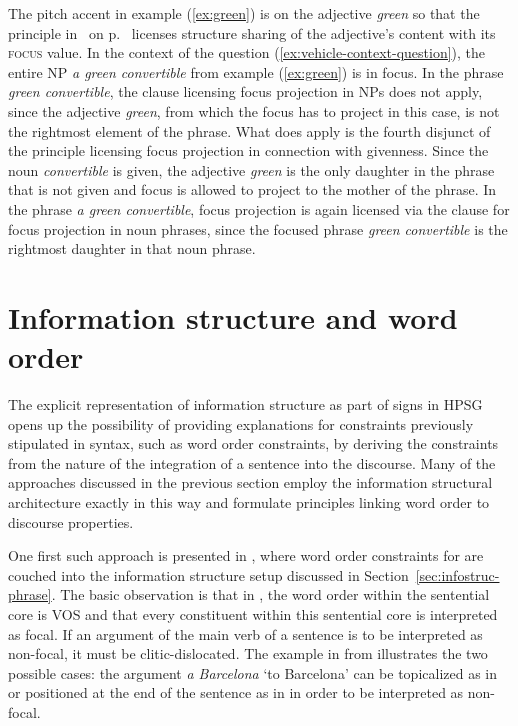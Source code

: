 \documentclass[output=paper,biblatex,babelshorthands,newtxmath,draftmode,colorlinks,citecolor=brown]{langscibook}
\begin{document}
The pitch accent in example (\ref{ex:green}) is on the adjective \textit{green} so
that the principle in~ on p.~\pageref{fig:words} licenses structure
sharing of the adjective's content with its \textsc{focus} value. In
the context of the question (\ref{ex:vehicle-context-question}), the
entire NP \textit{a green convertible} from example (\ref{ex:green}) is
in focus. In the phrase \textit{green convertible}, the clause
licensing focus projection in NPs does not apply, since the adjective
\textit{green}, from which the focus has to project in this case, is
not the rightmost element of the phrase.  What does apply is the
fourth disjunct of the principle licensing focus projection in
connection with givenness. Since the noun \textit{convertible} is
given, the adjective \textit{green} is the only daughter in the phrase
that is not given and focus is allowed to project to the mother of the
phrase. In the phrase \textit{a green convertible}, focus projection is
again licensed via the clause for focus projection in noun phrases,
since the focused phrase \textit{green convertible} is the rightmost
daughter in that noun phrase.


\section{Information structure and word order}
\label{sec:word-order}
The explicit representation of information structure as part of signs
in HPSG opens up the possibility of providing explanations for
constraints previously stipulated in syntax, such as word order
constraints, by deriving the constraints from the nature of the
integration of a sentence into the discourse. Many of the approaches
discussed in the previous section employ the information structural
architecture exactly in this way and formulate principles linking word
order to discourse properties.

One first such approach is presented in , where word order
constraints for  are couched into the information
structure setup discussed in Section~\ref{sec:infostruc-phrase}. The
basic observation is that in , the word order within the
sentential core is VOS and that every constituent within this
sentential core is interpreted as focal. If an argument of the main
verb of a sentence is to be interpreted as non-focal, it must be
clitic-dislocated. The example in  from 
illustrates the two possible cases: the argument \textit{a Barcelona}
`to Barcelona' can be topicalized as in  or positioned at
the end of the sentence as in  in order to be interpreted
as non-focal.
\end{document}
